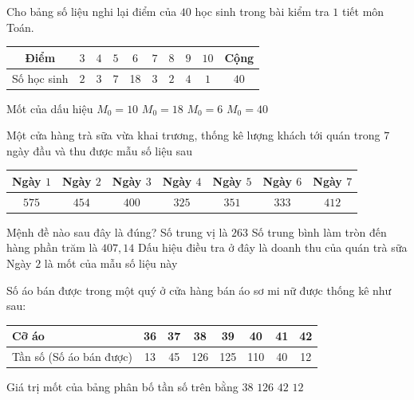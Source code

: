 \begin{ex}%
	Cho bảng số liệu nghi lại điểm của $40$ học sinh trong bài kiểm  tra $1$ tiết môn Toán.
	\begin{center}
		\begin{tabular}{|c|c|c|c|c|c|c|c|c|c|}
			\hline 
			Điểm & $3$ &  $4$ & $5$ & $6$ & $7$ & $8$ & $9$ & $10$ & Cộng\\
			 \hline
			Số học sinh & $2$ & $3$ & $7$ & 18 & $3$ & $2$ & $4$  & $1$ & $40$\\
			 \hline
		\end{tabular}
	\end{center}
	 Mốt của dấu hiệu
	 \choice
		 {$M_0=10$}
		 {$M_0=18$}
		{\True  $M_0=6$}
		 {$M_0=40$}
\end{ex}

\begin{ex}%
	Một  cửa hàng trà sữa vừa khai trương, thống kê lượng khách tới quán trong $7$ ngày đầu và thu được mẫu số liệu sau
	\begin{center}
		\begin{tabular}{|c|c|c|c|c|c|c|}
			 \hline
			Ngày $1$ & Ngày $2$ & Ngày $3$ & Ngày $4$ & Ngày $5$ & Ngày $6$ &  Ngày $7$\\
			 \hline
			$575$ & $454$ & $400$ & $325$ & $351$  & $333$ & $412$\\
			\hline 
		\end{tabular}
	\end{center}
	Mệnh đề  nào sau đây là đúng?
	 \choice
		{Số trung  vị là $263$}
		{\True Số trung bình làm tròn đến hàng  phần trăm là $407{,}14$}
		 {Dấu hiệu điều tra ở đây là doanh thu của quán trà sữa}
		{Ngày $2$ là mốt của  mẫu số liệu này}
\end{ex}

\begin{ex}%
	Số áo bán được trong một quý ở cửa hàng  bán áo sơ mi nữ được thống kê như sau:
	\begin{center}
		\begin{tabular}{|l|c|c|c|c|c|c|c|}
			\hline Cỡ áo & 36 &  37 & 38 & 39 & 40 & 41 & 42 \\
			 \hline
			 Tần số
			 (Số áo bán được)
			& 13 & 45  & 126 & 125 & 110 & 40 & 12 \\
			\hline 
		\end{tabular}
	\end{center}
	Giá trị mốt  của bảng phân bố tần số trên bằng
	 \choice
		{\True $38$} 
		{$126$} 
		 {$42$}
		 {$12$}
\end{ex}

